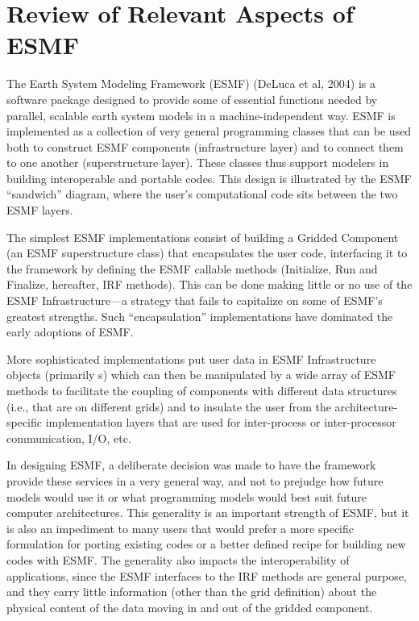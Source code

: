 \section{Review of Relevant Aspects of ESMF}

The Earth System Modeling Framework (ESMF) (DeLuca et al, 2004) is a
software package designed to provide some of essential functions
needed by parallel, scalable earth system models in a
machine-independent way. ESMF is implemented as a collection of very
general programming classes that can be used both to construct ESMF
components (infrastructure layer) and to connect them to one another
(superstructure layer). These classes thus support modelers in
building interoperable and portable codes. This design is illustrated
by the ESMF ``sandwich'' diagram, where the user's computational code
sits between the two ESMF layers.

The simplest ESMF implementations consist of building a Gridded
Component (an ESMF superstructure class) that encapsulates the user
code, interfacing it to the framework by defining the ESMF callable
methods (Initialize, Run and Finalize, hereafter, IRF methods). This
can be done making little or no use of the ESMF Infrastructure---a
strategy that fails to capitalize on some of ESMF's greatest
strengths. Such ``encapsulation'' implementations have dominated the early
adoptions of ESMF.

More sophisticated implementations put user data in ESMF
Infrastructure objects (primarily \fld s) which can then be
manipulated by a wide array of ESMF methods to facilitate the coupling
of components with different data structures (i.e., that are on
different grids) and to insulate the user
from the architecture-specific implementation layers that are used for
inter-process or inter-processor communication, I/O, etc.

In designing ESMF, a deliberate decision was made to have the
framework provide these services in a very general way, and not to
prejudge how future models would use it or what programming models
would best suit future computer architectures. This generality is an
important strength of ESMF, but it is also an impediment to many users
that would prefer a more specific formulation for porting existing
codes or a better defined recipe for building new codes with ESMF. The
generality also impacts the interoperability of applications, since
the ESMF interfaces to the IRF methods are general purpose, and they
carry little information (other than the grid definition) about the
physical content of the data moving in and out of the gridded
component.  

